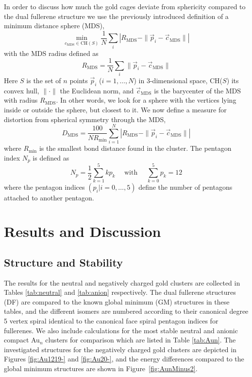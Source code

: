 In order to discuss how much the gold cages deviate from sphericity compared to
the dual fullerene structure we use the previously introduced definition of a
minimum distance sphere
(MDS),\autocite{Schwerdtfeger_Programfullerenesoftware_2013}
%
\begin{equation} 
\min\limits_{c_\mathrm{MDS} \in \mathrm{CH}(S)} \frac{1}{N} \sum _{i} \left|R_\mathrm{MDS} -\| \vec{p}_{i}-\vec{c}_\mathrm{MDS} \| \right|  
\end{equation}
with the MDS radius defined as
\begin{equation} 
	R_{\mathrm{MDS}} =\frac{1}{N} \sum _{i}\| \vec{p}_{i} -\vec{c}_{\mathrm{MDS}} \|   
	\label{eq:RMDS}
\end{equation}
%
Here $S$ is the set of $n$ points $\vec{p}_i$ ($i=1,\ldots ,N$) in
$3$-dimensional space, CH($S$) its convex hull, $\|\cdot\| $ the Euclidean
norm, and $\vec{c}_\mathrm{MDS}$ is the barycenter of the MDS with radius
$R_\mathrm{MDS}$. In other words, we look for a sphere with the vertices lying
inside or outside the sphere, but closest to it. We now define a measure for
distortion from spherical symmetry through the
MDS,\autocite{Schwerdtfeger_Programfullerenesoftware_2013}
%
\begin{equation}
  \label{eq:DMDS}
  D_{\mathrm{MDS}} = \frac{100}{N R_\mathrm{min}} \sum_{i=1}^N \left|R_{\mathrm{MDS}} - \|\vec{p}_i - \vec{c}_{\mathrm{MDS}}\| \right|
\end{equation}
where $R_\mathrm{min}$ is the smallest bond distance found in the cluster. The pentagon index $N_p$ is defined as
\begin{equation}
  \label{pentindex}
  N_p = \frac{1}{2}\sum_{k=1}^{5} kp_k \quad \text{ with } \quad  \sum_{k=0}^{5} p_k = 12
\end{equation}
%
where the pentagon indices $(p_i | i=0, \dots , 5)$ define the number of
pentagons attached to another pentagon.\autocite{Fowler-atlas-2006}


\section{\label{sec:ResDis}Results and Discussion}
\subsection{Structure and Stability}

The results for the neutral and negatively charged gold clusters are collected in
Tables \ref{tab:neutral} and \ref{tab:anion} respectively. The dual fullerene
structures (DF) are compared to the known global minimum (GM) structures in
these tables, and the different isomers are numbered according to their
canonical degree 5 vertex spiral identical to the canonical face spiral
pentagon indices for fullerenes.\autocite{Fowler-atlas-2006} We also include
calculations for the most stable neutral and anionic compact Au$_n$
clusters for comparison which are listed in Table \ref{tab:Aun}. The
investigated structures for the
negatively charged gold clusters are depicted in Figures \ref{fig:Au1219-} and
\ref{fig:Au20-}, and the energy differences compared to the global minimum structures
are shown in Figure~\ref{fig:AunMinus2}.

